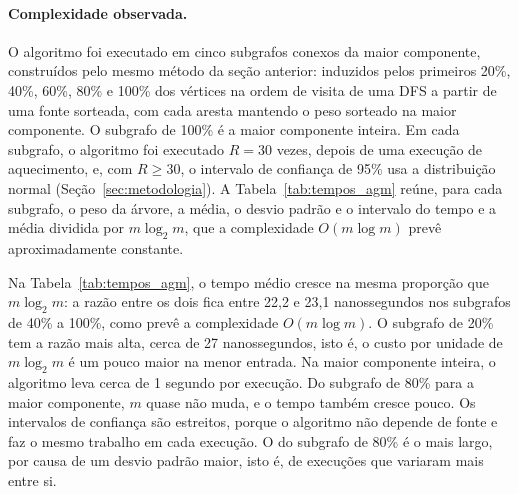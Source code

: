 \paragraph{Complexidade observada.} O algoritmo foi executado em cinco subgrafos conexos da maior componente, construídos pelo mesmo método da seção anterior: induzidos pelos primeiros 20\%, 40\%, 60\%, 80\% e 100\% dos vértices na ordem de visita de uma DFS a partir de uma fonte sorteada, com cada aresta mantendo o peso sorteado na maior componente. O subgrafo de 100\% é a maior componente inteira. Em cada subgrafo, o algoritmo foi executado $R = 30$ vezes, depois de uma execução de aquecimento, e, com $R \geq 30$, o intervalo de confiança de 95\% usa a distribuição normal (Seção~\ref{sec:metodologia}). A Tabela~\ref{tab:tempos_agm} reúne, para cada subgrafo, o peso da árvore, a média, o desvio padrão e o intervalo do tempo e a média dividida por $m \log_2 m$, que a complexidade $O(m \log m)$ prevê aproximadamente constante.

\begin{table}[htbp]
  \centering
  \caption{Peso da árvore geradora mínima e tempo de execução do Kruskal próprio, com pesos inteiros aleatórios em $[1, 10]$, em subgrafos conexos crescentes da maior componente, com $R$ execuções: média, desvio padrão amostral e intervalo de confiança de 95\% do tempo e média dividida por $m \log_2 m$.}
  \label{tab:tempos_agm}
  \resizebox{\textwidth}{!}{}
\end{table}

Na Tabela~\ref{tab:tempos_agm}, o tempo médio cresce na mesma proporção que $m \log_2 m$: a razão entre os dois fica entre 22,2 e 23,1 nanossegundos nos subgrafos de 40\% a 100\%, como prevê a complexidade $O(m \log m)$. O subgrafo de 20\% tem a razão mais alta, cerca de 27 nanossegundos, isto é, o custo por unidade de $m \log_2 m$ é um pouco maior na menor entrada. Na maior componente inteira, o algoritmo leva cerca de 1 segundo por execução. Do subgrafo de 80\% para a maior componente, $m$ quase não muda, e o tempo também cresce pouco. Os intervalos de confiança são estreitos, porque o algoritmo não depende de fonte e faz o mesmo trabalho em cada execução. O do subgrafo de 80\% é o mais largo, por causa de um desvio padrão maior, isto é, de execuções que variaram mais entre si.
